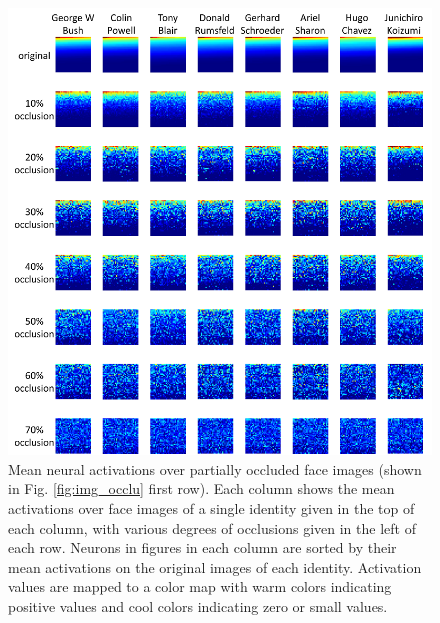 \documentclass[10pt,twocolumn,letterpaper]{article}
\begin{document}
\begin{figure}[t]
\begin{center}
\includegraphics[width=0.95\linewidth]{picture/16c.png}
\end{center}
\vspace{-0.1in}
\caption{Mean neural activations over partially occluded face images (shown in Fig. \ref{fig:img_occlu} first row). Each column shows the mean activations over face images of a single identity given in the top of each column, with various degrees of occlusions given in the left of each row. Neurons in figures in each column are sorted by their mean activations on the original images of each identity. Activation values are mapped to a color map with warm colors indicating positive values and cool colors indicating zero or small values.}
\label{fig:act_occlu_part}
\vspace{-0.05in}
\end{figure}
\end{document}
